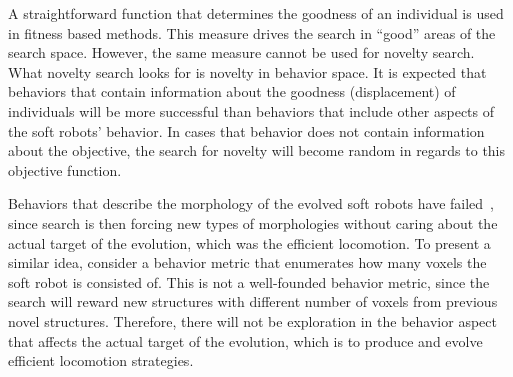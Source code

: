 A straightforward function that determines the goodness of an individual is used in fitness based methods. This measure drives the search in ``good'' areas of the search space. However, the same measure cannot be used for novelty search. What novelty search looks for is novelty in behavior space. It is expected that behaviors that contain information about the goodness (displacement) of individuals will be more successful than behaviors that include other aspects of the soft robots' behavior. In cases that behavior does not contain information about the objective, the search for novelty will become random in regards to this objective function.

Behaviors that describe the morphology of the evolved soft robots have failed~\citep{lehman2011evolving}, since search is then forcing new types of morphologies without caring about the actual target of the evolution, which was the efficient locomotion. To present a similar idea, consider a behavior metric that enumerates how many voxels the soft robot is consisted of. This is not a well-founded behavior metric, since the search will reward new structures with different number of voxels from previous novel structures. Therefore, there will not be exploration in the behavior aspect that affects the actual target of the evolution, which is to produce and evolve efficient locomotion strategies. 

